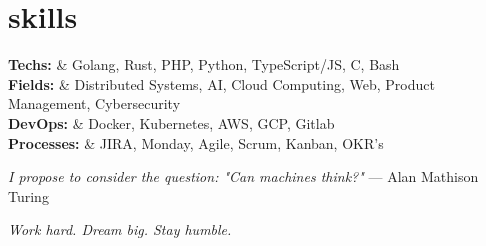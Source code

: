 \documentclass[]{cv-mauri}
\begin{document}
\section*{skills}
\begin{tabularcv}
	\textbf{Techs:} & Golang, Rust, PHP, Python, TypeScript/JS, C, Bash \\
	\textbf{Fields:} & Distributed Systems, AI, Cloud Computing, Web, Product Management, Cybersecurity \\
	\textbf{DevOps:} & Docker, Kubernetes, AWS, GCP, Gitlab \\
	\textbf{Processes:} & JIRA, Monday, Agile, Scrum, Kanban, OKR's \\
\end{tabularcv}


\vspace{1cm}
\textit{I propose to consider the question: "Can machines think?"} — Alan Mathison Turing

\textit{Work hard. Dream big. Stay humble.}

\end{document}

